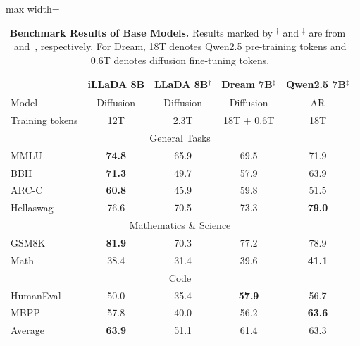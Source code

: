 \documentclass[]{bytedance_seed}
\begin{document}
\begin{table}[t!]
    \centering
    \caption{\textbf{Benchmark Results of Base Models.} Results marked by $^{\dagger}$ and $^{\ddagger}$ are from~\citet{nie2026large} and~\citet{ye2025dream}, respectively. For Dream, 18T denotes Qwen2.5 pre-training tokens and 0.6T denotes diffusion fine-tuning tokens.}
    \label{tab:base}
    \begin{adjustbox}{max width=\textwidth}
    \begin{tabular}{l|cccc}
      \toprule
          & iLLaDA 8B & LLaDA 8B$^{\dagger}$ & Dream 7B$^{\ddagger}$ & Qwen2.5 7B$^{\ddagger}$ \\
      \midrule
      Model & Diffusion & Diffusion & Diffusion & AR \\
      Training tokens & 12T & 2.3T & 18T + 0.6T & 18T \\
      \midrule
      \multicolumn{5}{c}{General Tasks}\\
      \midrule
      MMLU & \textbf{74.8} & 65.9 & 69.5 & 71.9 \\
      BBH & \textbf{71.3} & 49.7 & 57.9 & 63.9 \\
      ARC-C & \textbf{60.8} & 45.9 & 59.8 & 51.5 \\
      Hellaswag & 76.6 & 70.5 & 73.3 & \textbf{79.0} \\
      \midrule
      \multicolumn{5}{c}{Mathematics \& Science}\\
      \midrule
      GSM8K & \textbf{81.9} & 70.3 & 77.2 & 78.9 \\
      Math & 38.4 & 31.4 & 39.6 & \textbf{41.1} \\
      \midrule
      \multicolumn{5}{c}{Code} \\
      \midrule
      HumanEval & 50.0 & 35.4 & \textbf{57.9} & 56.7 \\
      MBPP & 57.8 & 40.0 & 56.2 & \textbf{63.6} \\
      \midrule
      Average & \textbf{63.9} & 51.1 & 61.4 & 63.3 \\
      \bottomrule
    \end{tabular}
    \end{adjustbox}
\end{table}
\end{document}
